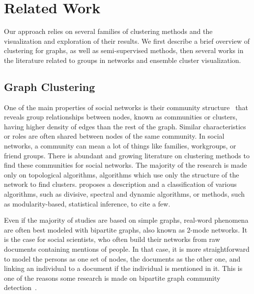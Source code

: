 \section{Related Work}

Our approach relies on several families of clustering methods and the visualization and exploration of their results. We first describe a brief overview of clustering for graphs, as well as semi-supervised methods, then several works in the literature related to groups in networks and ensemble cluster visualization.

\subsection{Graph Clustering}

One of the main properties of social networks is their community structure~\cite{Girvan7821} that reveals group relationships between nodes, known as communities or clusters, having higher density of edges than the rest of the graph. Similar characteristics or roles are often shared between nodes of the same community.
In social networks, a community can mean a lot of things like families, workgroups, or friend groups. There is abundant and growing literature on clustering methods to find these communities for social networks. The majority of the research is made only on topological algorithms, \ie algorithms which use only the structure of the network to find clusters. \cite{FORTUNATO201075} proposes a description and a classification of various algorithms, such as divisive, spectral and dynamic algorithms, or methods, such as modularity-based, statistical inference, to cite a few.

Even if the majority of studies are based on simple graphs, real-word phenomena are often best modeled with bipartite graphs, also known as 2-mode networks. It is the case for social scientists, who often build their networks from raw documents containing mentions of people. In that case, it is more straightforward to model the persons as one set of nodes, the documents as the other one, and linking an individual to a document if the individual is mentioned in it. This is one of the reasons some research is made on bipartite graph community detection~\cite{alzahrani2016community}.

